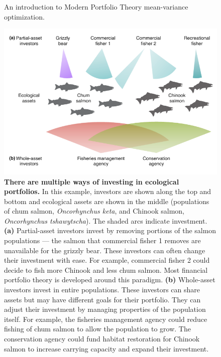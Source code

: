 \begin{figure}[htbp]
\centering
\caption{
An introduction to Modern Portfolio Theory mean-variance optimization.
}
\label{fig:mpt}
\end{figure}

\clearpage

\begin{figure}[htbp]
\centering \includegraphics[width=5in]{salmon-portfolios.pdf} \caption{\textbf{There
  are multiple ways of investing in ecological portfolios.} In this example,
  investors are shown along the top and bottom and ecological assets are shown
  in the middle (populations of chum salmon, \textit{Oncorhynchus keta}, and
  Chinook salmon, \textit{Oncorhynchus tshawytscha}). The shaded arcs indicate
  investment. \textbf{(a)} Partial-asset investors invest by removing portions
  of the salmon populations --- the salmon that commercial fisher 1 removes are
  unavailable for the grizzly bear. These investors can often change their
  investment with ease. For example, commercial fisher 2 could decide to fish
  more Chinook and less chum salmon. Most financial portfolio theory is
  developed around this paradigm. \textbf{(b)} Whole-asset investors invest in
  entire populations. These investors can share assets but may have different
  goals for their portfolio. They can adjust their investment by managing
  properties of the population itself. For example, the fisheries management
  agency could reduce fishing of chum salmon to allow the population to grow.
  The conservation agency could fund habitat restoration for Chinook salmon to
  increase carrying capacity and expand their investment.}
\label{fig:salmonport}
\end{figure}

